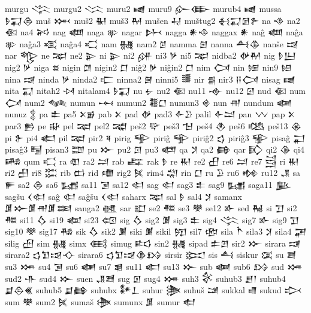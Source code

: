  murgu  𒋞   
 murgu2  𒈱   
 muru2  𒉠   
 muru9  𒅎𒂂    
 murub4  𒉠   
 mussa  𒊩𒍑𒁲    
 muš  𒈲   
 muš2  𒈽   
 muš3  𒈹   
 mušen  𒄷   
 muštug2  𒈬𒍑𒌆𒉿    
 na  𒈾   
 na2  𒈿   
 na4  𒎎   
 nag  𒅘   
 naga  𒉀   
 nagar  𒉄   
 nagga  𒀭𒈾    
 naggax  𒀭   
 naĝ  𒅘   
 naĝa  𒉀   
 naĝa3  𒄤   
 naĝa4  𒄣   
 nam  𒉆   
 nam2  𒉇   
 namma  𒇉   
 nanna  𒋀𒆠    
 nanše  𒀏   
 nar  𒈜   
 ne  𒉈   
 ne2  𒉌   
 ni  𒉌   
 ni2  𒉎   
 ni3  𒃻   
 ni5  𒉈   
 nidba2  𒉻𒈹    
 nig  𒊩𒌨    
 nig2  𒃻   
 niga  𒊺   
 nigin  𒇔   
 nigin2  𒆸   
 niĝ2  𒃻   
 niĝin2  𒆸   
 nim  𒉏   
 nin  𒎏   
 nin9  𒎐   
 nina  𒀏   
 ninda  𒃻   
 ninda2  𒉒   
 ninna2  𒇧   
 ninni5  𒌃   
 nir  𒉪   
 nir3  𒍝𒉏    
 nisag  𒉠   
 nita  𒍑   
 nitah2  𒀴   
 nitalam4  𒊩𒍑    
 nu  𒉡   
 nu2  𒈿   
 nu11  𒉢   
 nu12  𒇻   
 nud  𒈿   
 num  𒉏   
 num2  𒈝   
 numun  𒆰   
 numun2  𒍤𒆸    
 numun3  𒄴   
 nun  𒉣   
 nundum  𒅻   
 nunuz  𒉭   
 pa  𒉺   
 pa5  𒉽𒂊    
 pab  𒉽   
 pad  𒉻   
 pad3  𒅆𒊒    
 palil  𒅆𒁺    
 pan  𒉼   
 pap  𒉽   
 par3  𒁖   
 pe  𒄫   
 pel  𒉈   
 pel2  𒉋   
 peš2  𒉾   
 peš3  𒈠   
 peš4  𒊯   
 peš6  𒆓   
 peš13  𒊴   
 pi  𒉿   
 pi4  𒅗   
 pil  𒉈   
 pir2  𒎕   
 pirig  𒊊   
 piriĝ  𒊊   
 piriĝ2  𒌓   
 piriĝ3  𒊌   
 pisaĝ  𒂷   
 pisaĝ3  𒋄   
 pisan3  𒊿   
 pu  𒁍   
 pu2  𒇥   
 pu3  𒅤   
 qa  𒋡   
 qa2  𒂵   
 qar  𒃼   
 qi2  𒆠   
 qi4  𒄄   
 qum  𒄣   
 ra  𒊏   
 ra2  𒁺   
 rab  𒊐   
 rak  𒊩   
 re  𒊑   
 re2  𒌷   
 re6  𒁺   
 re7  𒁻   
 ri  𒊑   
 ri2  𒌷   
 ri8  𒈶   
 rib  𒆗   
 rid  𒈩   
 rig2  𒍮   
 rim4  𒁽   
 rin  𒆸   
 ru  𒊒   
 ru6  𒂔   
 ru12  𒂗   
 sa  𒊓   
 sa2  𒁲   
 sa6  𒊷   
 sa11  𒋜   
 sa12  𒊕   
 sag  𒊕   
 sag3  𒉺   
 sag9  𒊷   
 saga11  𒆥   
 sagšu  𒌋𒊕    
 saĝ  𒊕   
 saĝšu  𒌋𒊕    
 saharx  𒉈   
 sal  𒊩   
 sal4  𒋡   
 samanx  𒂠𒁍𒂠𒉣𒂠𒌅    
 sanga2  𒊫   
 sar  𒊬   
 se2  𒍣   
 se3  𒋧   
 se12  𒅊   
 sed  𒈻   
 si  𒋛   
 si2  𒍣   
 si11  𒋝   
 si19  𒆉   
 si23  𒄢   
 sig  𒋝   
 sig2  𒋠   
 sig3  𒉺   
 sig4  𒋞   
 sig7  𒅊   
 sig9  𒋛   
 sig10  𒋧   
 sig17  𒄀   
 sik  𒋝   
 sik2  𒋠   
 siki  𒋠   
 sikil  𒂖   
 sil7  𒂣   
 sila  𒋻   
 sila3  𒋡   
 sila4  𒃢   
 silig  𒍂   
 sim  𒉆   
 simx  𒍼   
 simug  𒌣   
 sin2  𒉆   
 sipad  𒉺𒇻    
 sir2  𒁍   
 sirara  𒀏   
 sirara2  𒌓𒈣𒀏𒋓    
 sirara6  𒌓𒈣𒀏𒆠𒋳    
 sirsir  𒁎   
 sis  𒋀   
 siskur  𒀬   
 su  𒋢   
 su3  𒋤   
 su4  𒋜   
 su6  𒅾   
 su7  𒇭   
 su11  𒅗   
 su13  𒁍   
 sub  𒅢   
 sub6  𒋳   
 sud  𒋤   
 sud2  𒋥   
 sud4  𒁍   
 suen  𒂗𒍪    
 sug  𒆹   
 sug4  𒋤   
 suh3  𒄗   
 suhub3  𒋗𒁹    
 suhub4  𒋗𒁲𒌍    
 suhub5  𒋗𒂵    
 suhubx  𒀯𒁇    
 suhur  𒋦   
 suhuš  𒁼   
 sukkal  𒈛   
 sukud  𒃴   
 sum  𒋧   
 sum2  𒍮   
 sumaš  𒋨   
 sumunx  𒂠   
 sumur  𒊨   
